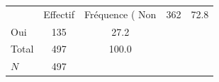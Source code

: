 {
\def\sym#1{\ifmmode^{#1}\else\(^{#1}\)\fi}
\begin{tabular}{l*{1}{cc}}
\toprule
            &    Effectif&Fréquence (%
\midrule
Non         &         362&        72.8\\
Oui         &         135&        27.2\\
Total       &         497&       100.0\\
\midrule
\(N\)       &         497&            \\
\bottomrule
\end{tabular}
}
